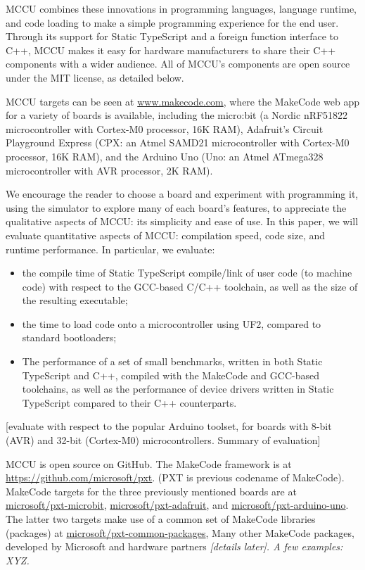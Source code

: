 MCCU combines these innovations in programming languages, language runtime, and code loading to make a simple 
programming experience for the end user.  Through its support for Static TypeScript and a foreign function 
interface to C++, MCCU makes it easy for hardware manufacturers to share their C++ components with a wider audience.  
All of MCCU's components are open source under the MIT license, as detailed below. 

MCCU targets can be seen at \url{www.makecode.com}, where the MakeCode web app for a variety of boards is available, 
including the micro:bit (a Nordic nRF51822 microcontroller with Cortex-M0 processor, 16K RAM), Adafruit's Circuit 
Playground Express (CPX: an Atmel SAMD21 microcontroller with Cortex-M0 processor, 16K RAM), and the Arduino Uno 
(Uno: an Atmel ATmega328 microcontroller with AVR processor, 2K RAM). 

We encourage the reader to choose a board and experiment with programming it, using the simulator to explore many of each board's features, 
to appreciate the qualitative aspects of MCCU: its simplicity and ease of use.  In this paper, we will evaluate quantitative aspects of MCCU: 
compilation speed, code size, and runtime performance.  In particular, we evaluate:
\begin{itemize}
\item the compile time of Static TypeScript compile/link of user code (to machine code) with respect to the GCC-based C/C++ toolchain, as well as the size of the resulting executable;
\item the time to load code onto a microcontroller using UF2, compared to standard bootloaders; 
\item The performance of a set of small benchmarks, written in both Static TypeScript and C++, compiled with the MakeCode and GCC-based toolchains, as well as the performance of device drivers written in Static TypeScript compared to their C++ counterparts.
\end{itemize}
[evaluate with respect to the popular Arduino toolset, for boards with 8-bit (AVR) and 32-bit (Cortex-M0) microcontrollers. 
Summary of evaluation]

MCCU is open source on GitHub. The MakeCode framework is at \url{https://github.com/microsoft/pxt}.
(PXT is previous codename of MakeCode). 
MakeCode targets for the three previously mentioned boards are at 
\href{https://github.com/microsoft/pxt-microbit}{microsoft/pxt-microbit}, 
\href{https://github.com/microsoft/pxt-adafruit}{microsoft/pxt-adafruit}, and
\href{https://github.com/microsoft/pxt-arduino-uno}{microsoft/pxt-arduino-uno}.
The latter two targets make use of a common set of MakeCode libraries (packages) at
\href{https://github.com/microsoft/pxt-common-packages}{microsoft/pxt-common-packages},  
Many other MakeCode packages, developed by Microsoft and 
hardware partners \emph{ [details later]. A few examples: XYZ.  }

